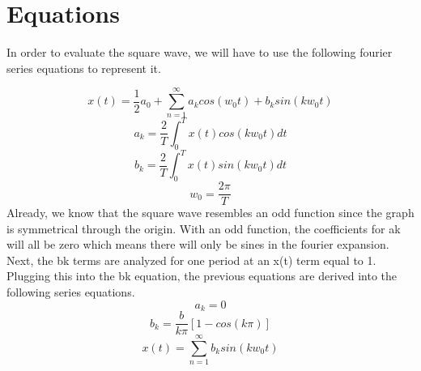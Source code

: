 \documentclass[12pt]{report}
\begin{document}
\section{Equations}
\hspace{\parindent}In order to evaluate the square wave, we will have to use the following fourier series equations to represent it. \par
\[x(t) = \frac{1}{2}a_0+\sum_{n=1}^{\infty}a_kcos(w_0t)+b_ksin(kw_0t)\]
\[a_k = \frac{2}{T}\int_{0}^{T}x(t)cos(kw_0t)dt\]
\[b_k = \frac{2}{T}\int_{0}^{T}x(t)sin(kw_0t)dt\]
\[w_0 = \frac{2\pi}{T}\]
\hspace{\parindent}Already, we know that the square wave resembles an odd function since the graph is symmetrical through the origin. With an odd function, the coefficients for ak will all be zero which means there will only be sines in the fourier expansion. Next, the bk terms are analyzed for one period at an x(t) term equal to 1. Plugging this into the bk equation, the previous equations are derived into the following series equations.
\[a_k = 0\]
\[b_k = \frac{b}{k\pi}[1-cos(k\pi)]\]
\[x(t) = \sum_{n=1}^{\infty}b_ksin(kw_0t)\]
\end{document}
